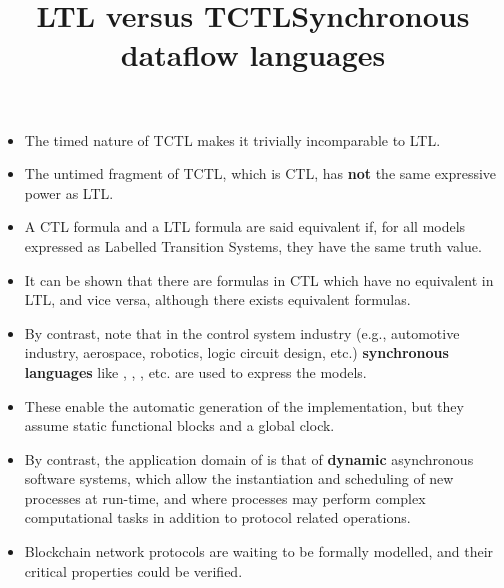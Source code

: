 \documentclass[wide]{slides}
\begin{document}
\begin{slide}
  \title{LTL versus TCTL}

  \begin{itemize}

    \item The timed nature of TCTL makes it trivially incomparable to
      LTL.

    \item The untimed fragment of TCTL, which is CTL, has \textbf{not}
      the same expressive power as LTL.

    \item A CTL formula and a LTL formula are said equivalent if, for
      all models expressed as Labelled Transition Systems, they have
      the same truth value.

    \item It can be shown that there are formulas in CTL which have no
      equivalent in LTL, and vice versa, although there exists
      equivalent formulas.

  \end{itemize}

\end{slide}
\begin{slide}
  \title{Synchronous dataflow languages}

  \begin{itemize}

    \item By contrast, note that in the control system industry (e.g.,
      automotive industry, aerospace, robotics, logic circuit design,
      etc.) \textbf{synchronous languages} like \Esterel, \Lustre,
      \Simulink, etc. are used to express the models.

    \item These enable the automatic generation of the implementation,
      but they assume static functional blocks and a global clock.

    \item By contrast, the application domain of \SPIN is that of
      \textbf{dynamic} asynchronous software systems, which allow the
      instantiation and scheduling of new processes at run\hyp{}time,
      and where processes may perform complex computational tasks in
      addition to protocol related operations.

    \item Blockchain network protocols are waiting to be formally
      modelled, and their critical properties could be verified.

  \end{itemize}

\end{slide}
\end{document}
